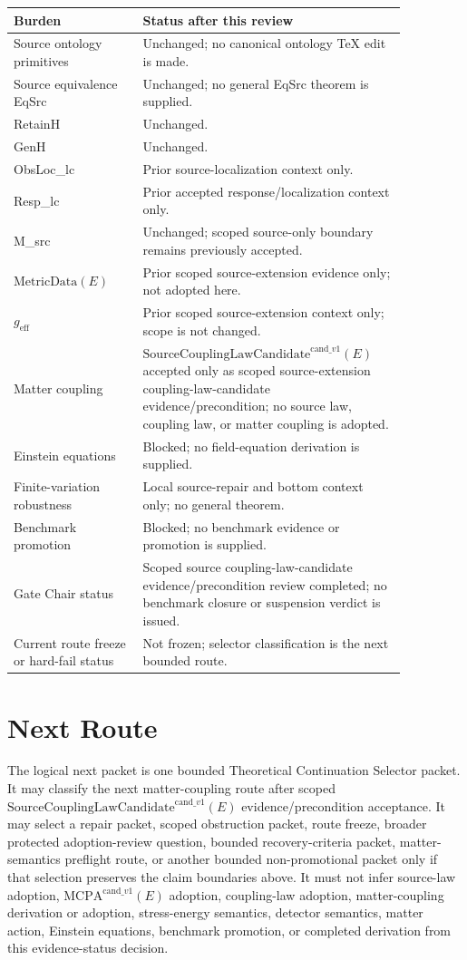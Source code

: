 \documentclass[11pt]{article}
\newcommand{\SCLC}{\mathrm{SourceCouplingLawCandidate}^{\mathrm{cand}\_v1}}
\newcommand{\MCPA}{\mathrm{MCPA}^{\mathrm{cand}\_v1}}
\newcommand{\MetricData}{\mathrm{MetricData}}
\newcommand{\geff}{g_{\mathrm{eff}}}
\begin{document}
\begin{longtable}{p{0.30\linewidth}p{0.56\linewidth}}
\toprule
Burden & Status after this review \\
\midrule
Source ontology primitives & Unchanged; no canonical ontology TeX edit is made. \\
Source equivalence EqSrc & Unchanged; no general EqSrc theorem is supplied. \\
RetainH & Unchanged. \\
GenH & Unchanged. \\
ObsLoc\_lc & Prior source-localization context only. \\
Resp\_lc & Prior accepted response/localization context only. \\
M\_src & Unchanged; scoped source-only boundary remains previously accepted. \\
\(\MetricData(E)\) & Prior scoped source-extension evidence only; not adopted here. \\
\(\geff\) & Prior scoped source-extension context only; scope is not changed. \\
Matter coupling & \(\SCLC(E)\) accepted only as scoped source-extension coupling-law-candidate evidence/precondition; no source law, coupling law, or matter coupling is adopted. \\
Einstein equations & Blocked; no field-equation derivation is supplied. \\
Finite-variation robustness & Local source-repair and bottom context only; no general theorem. \\
Benchmark promotion & Blocked; no benchmark evidence or promotion is supplied. \\
Gate Chair status & Scoped source coupling-law-candidate evidence/precondition review completed; no benchmark closure or suspension verdict is issued. \\
Current route freeze or hard-fail status & Not frozen; selector classification is the next bounded route. \\
\bottomrule
\end{longtable}

\section{Next Route}

The logical next packet is one bounded Theoretical Continuation Selector
packet. It may classify the next matter-coupling route after scoped
\(\SCLC(E)\) evidence/precondition acceptance. It may select a repair packet,
scoped obstruction packet, route freeze, broader protected adoption-review
question, bounded recovery-criteria packet, matter-semantics preflight route,
or another bounded non-promotional packet only if that selection preserves the
claim boundaries above. It must not infer source-law adoption, \(\MCPA(E)\)
adoption, coupling-law adoption, matter-coupling derivation or adoption,
stress-energy semantics, detector semantics, matter action, Einstein
equations, benchmark promotion, or completed derivation from this
evidence-status decision.
\end{document}
